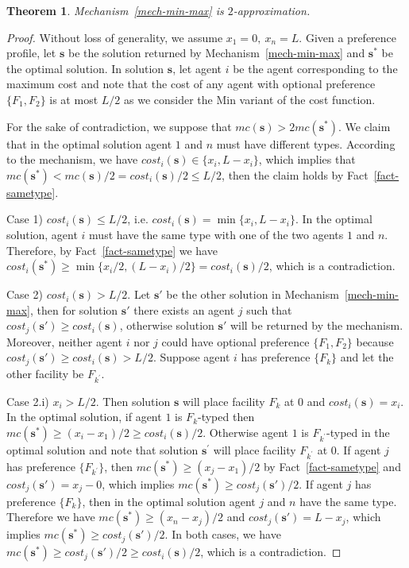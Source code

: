 \documentclass[twoside,11pt]{article}
\newtheorem{theorem}{Theorem}
\newcommand{\bd}{\mathbf}
\begin{document}
\begin{theorem}\label{t-min-max-upper}
Mechanism~\ref{mech-min-max} is $2$-approximation.
\end{theorem}
\begin{proof}
Without loss of generality, we assume  $x_1 = 0,~x_n = L$.
Given a preference profile, let $\bd{s}$ be the solution returned by Mechanism~\ref{mech-min-max} and $\bd{s^*}$ be the optimal solution.
In solution $\bd{s}$, let agent $i$ be the agent corresponding to the maximum cost and note that the cost of any agent with optional preference $\{F_1,F_2\}$ is at most $L/2$ as we consider the Min variant of the cost function.

For the sake of contradiction, we suppose that $mc(\bd{s})>2 mc(\bd{s^*})$.
We claim that in the optimal solution agent $1$ and $n$ must have different types.
According to the mechanism, we have $cost_i(\bd{s}) \in \{x_i,L-x_i\}$, which implies that $mc(\bd{s^*}) < mc(\bd{s})/2 = cost_i(\bd{s})/2 \le L/2$, then the claim holds by Fact~\ref{fact-sametype}.
%

Case 1) $cost_i(\bd{s}) \le L/2$, i.e. $cost_i(\bd{s}) = \min \{x_i,L-x_i\}$.
In the optimal solution, agent $i$ must have the same type with one of the two agents $1$ and $n$. Therefore, by Fact~\ref{fact-sametype} we have  $cost_i(\bd{s^*}) \ge \min\{x_i/2,(L-x_i)/2\} = cost_i(\bd{s})/2$, which is a contradiction.

Case 2) $cost_i(\bd{s}) > L/2$.
Let $\bd{s'}$ be the other solution in Mechanism~\ref{mech-min-max}, then
for solution $\bd{s'}$ there exists an agent $j$ such that $cost_j(\bd{s'}) \ge cost_i(\bd{s})$, otherwise solution $\bd{s'}$ will be returned by the mechanism.
Moreover, neither agent $i$ nor $j$ could have optional preference $\{F_1,F_2\}$ because
$cost_j(\bd{s'}) \ge cost_i(\bd{s}) > L/2$.
Suppose agent $i$ has preference $\{F_k\}$ and let the other facility be $F_{k^{'}}$.

Case 2.i) $x_i>L/2$. Then solution $\bd{s}$ will place facility $F_k$ at $0$ and $cost_i(\bd{s}) = x_i$.
In the optimal solution, if agent $1$ is $F_k$-typed then $mc(\bd{s^*}) \ge (x_i - x_1)/2 \ge cost_i(\bd{s})/2$. Otherwise agent $1$ is $F_{k^{'}}$-typed in the optimal solution and note that solution $\bd{s^{'}}$ will place facility $F_{k^{'}}$ at $0$.
If agent $j$ has preference $\{F_{k^{'}}\}$,
then $mc(\bd{s^*}) \ge (x_j - x_1)/2$ by Fact~\ref{fact-sametype} and $cost_j(\bd{s'}) = x_j - 0$, which implies $mc(\bd{s^*}) \ge cost_j(\bd{s'})/2 $.
If agent $j$ has preference $\{F_{k}\}$, then in the optimal solution agent $j$ and $n$ have the same type. Therefore we have $mc(\bd{s^*}) \ge (x_n - x_j)/2$ and $cost_j(\bd{s'}) = L - x_j$, which implies $mc(\bd{s^*}) \ge cost_j(\bd{s'})/2 $.
In both cases, we have  $mc(\bd{s^*}) \ge cost_j(\bd{s'})/2 \ge cost_i(\bd{s}) / 2$, which is a contradiction.


\end{proof}
\end{document}
